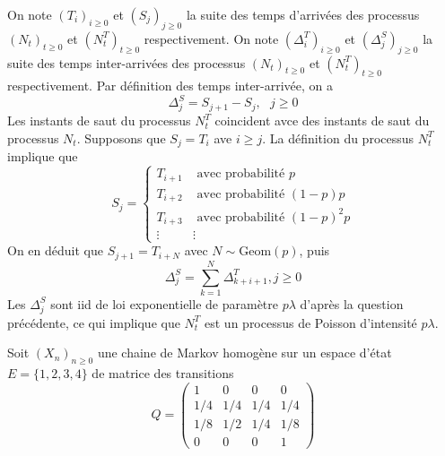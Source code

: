 \documentclass[11pt, addpoints, answers]{exam}
\begin{document}
\begin{questions}
\begin{solution}
On note $(T_i)_{i\geq0}$ et $(S_j)_{j\geq0}$ la suite des temps d'arrivées des processus $(N_t)_{t\geq0}$ et $(N_t^T)_{t\geq0}$ respectivement. On note $(\Delta^T_i)_{i\geq0}$ et $(\Delta^S_j)_{j\geq0}$ la suite des temps inter-arrivées des processus $(N_t)_{t\geq0}$ et $(N_t^T)_{t\geq0}$ respectivement. Par définition des temps inter-arrivée, on a 
$$
\Delta^S_j = S_{j+1}-S_j,\text{ }j\geq0 
$$
Les instants de saut du processus $N_t^T$ coincident avce des instants de saut du processus $N_t$. Supposons que $S_j = T_i$ ave $i\geq j$. La définition du processus $N_t^T$ implique que 
$$
S_j =\begin{cases}
T_{i+1}&\text{ avec probabilité }p\\
T_{i+2}&\text{ avec probabilité }(1-p)p\\
T_{i+3}&\text{ avec probabilité }(1-p)^2p\\
\vdots & \vdots
\end{cases} 
$$
On en déduit que $S_{j+1} = T_{i+N}$ avec $N\sim\text{Geom}(p)$, puis
$$
\Delta^S_j = \sum_{k = 1}^N\Delta^T_{k+i+1}, j \geq0
$$
Les $\Delta^S_j$ sont iid de loi exponentielle de paramètre $p\lambda$ d'après la question précédente, ce qui implique que $N_t^T$ est un processus de Poisson d'intensité $p\lambda$.
\end{solution}
\question Soit $(X_n)_{n\geq0}$ une chaine de Markov homogène sur un espace d'état $E = \{1,2,3,4\}$ de matrice des transitions
$$
Q = \left(\begin{array}{cccc}
1&0&0&0\\
1/4&1/4&1/4&1/4\\
1/8&1/2&1/4&1/8\\
0&0&0&1\end{array}\right)
$$
\end{questions}
\end{document}
